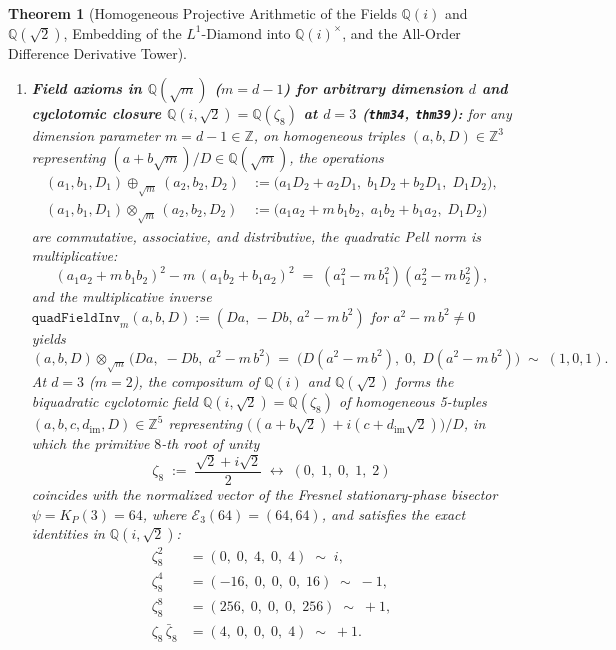 \documentclass[11pt,a4paper]{article}
\theoremstyle{plain}
\newtheorem{theorem}{Theorem}[section]
\theoremstyle{definition}
\begin{document}
\begin{theorem}[Homogeneous Projective Arithmetic of the Fields $\mathbb{Q}(i)$ and $\mathbb{Q}(\sqrt{2})$, Embedding of the $L^1$-Diamond into $\mathbb{Q}(i)^\times$, and the All-Order Difference Derivative Tower]
\begin{enumerate}[label=\textbf{(\roman*)},leftmargin=*]
\item \textbf{Field axioms in $\mathbb{Q}(\sqrt{m})$ ($m = d - 1$) for arbitrary dimension $d$ and cyclotomic closure $\mathbb{Q}(i, \sqrt{2}) = \mathbb{Q}(\zeta_8)$ at $d = 3$ (\texttt{thm34}, \texttt{thm39}):}
  for any dimension parameter $m = d - 1 \in \mathbb{Z}$, on homogeneous triples $(a, b, D) \in \mathbb{Z}^3$ representing $(a + b\sqrt{m})/D \in \mathbb{Q}(\sqrt{m})$, the operations
  \begin{align}
    (a_1, b_1, D_1) \oplus_{\sqrt{m}} (a_2, b_2, D_2) &:= \bigl(a_1 D_2 + a_2 D_1,\; b_1 D_2 + b_2 D_1,\; D_1 D_2\bigr), \label{eq:sqrt2-field-add} \\
    (a_1, b_1, D_1) \otimes_{\sqrt{m}} (a_2, b_2, D_2) &:= \bigl(a_1 a_2 + m\,b_1 b_2,\; a_1 b_2 + b_1 a_2,\; D_1 D_2\bigr) \label{eq:sqrt2-field-mul}
  \end{align}
  are commutative, associative, and distributive, the quadratic Pell norm is multiplicative:
  \begin{equation}
    \label{eq:pell-norm-mult}
    (a_1 a_2 + m\,b_1 b_2)^2 - m\,(a_1 b_2 + b_1 a_2)^2 \;=\; (a_1^2 - m\,b_1^2)(a_2^2 - m\,b_2^2),
  \end{equation}
  and the multiplicative inverse $\texttt{quadFieldInv}_m(a, b, D) := (Da,\, -Db,\, a^2 - m\,b^2)$ for $a^2 - m\,b^2 \ne 0$ yields
  \begin{equation}
    \label{eq:sqrt2-field-inverse}
    (a, b, D) \otimes_{\sqrt{m}} \bigl(Da,\; -Db,\; a^2 - m\,b^2\bigr) \;=\; \bigl(D(a^2 - m\,b^2),\; 0,\; D(a^2 - m\,b^2)\bigr) \;\sim\; (1, 0, 1).
  \end{equation}
  At $d = 3$ ($m = 2$), the compositum of $\mathbb{Q}(i)$ and $\mathbb{Q}(\sqrt{2})$ forms the biquadratic cyclotomic field $\mathbb{Q}(i, \sqrt{2}) = \mathbb{Q}(\zeta_8)$ of homogeneous 5-tuples $(a, b, c, d_{\mathrm{im}}, D) \in \mathbb{Z}^5$ representing $\bigl((a + b\sqrt{2}) + i(c + d_{\mathrm{im}}\sqrt{2})\bigr)/D$, in which the primitive $8$-th root of unity
  \begin{equation}
    \label{eq:zeta8-def}
    \zeta_8 \;:=\; \frac{\sqrt{2} + i\sqrt{2}}{2} \;\longleftrightarrow\; (0,\; 1,\; 0,\; 1,\; 2)
  \end{equation}
  coincides with the normalized vector of the Fresnel stationary-phase bisector $\psi = K_P(3) = 64$, where $\mathcal{E}_3(64) = (64, 64)$, and satisfies the exact identities in $\mathbb{Q}(i, \sqrt{2})$:
  \begin{align}
    \zeta_8^2 &= (0,\; 0,\; 4,\; 0,\; 4) \;\sim\; i, \label{eq:zeta8-sq} \\
    \zeta_8^4 &= (-16,\; 0,\; 0,\; 0,\; 16) \;\sim\; -1, \label{eq:zeta8-pow4} \\
    \zeta_8^8 &= (256,\; 0,\; 0,\; 0,\; 256) \;\sim\; +1, \label{eq:zeta8-pow8} \\
    \zeta_8\,\bar{\zeta}_8 &= (4,\; 0,\; 0,\; 0,\; 4) \;\sim\; +1. \label{eq:zeta8-norm}
  \end{align}


\end{enumerate}
\end{theorem}
\end{document}
